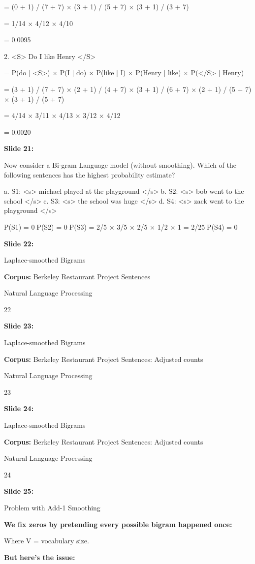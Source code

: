 \documentclass[11pt,a4paper]{article}
\begin{document}
= (0 + 1) / (7 + 7) × (3 + 1) / (5 + 7) × (3 + 1) / (3 + 7)

= 1/14 × 4/12 × 4/10

= 0.0095

2. <S> Do I like Henry </S>

= P(do | <S>) × P(I | do) × P(like | I) × P(Henry | like) × P(</S> | Henry)

= (3 + 1) / (7 + 7) × (2 + 1) / (4 + 7) × (3 + 1) / (6 + 7) × (2 + 1) / (5 + 7) × (3 + 1) / (5 + 7)

= 4/14 × 3/11 × 4/13 × 3/12 × 4/12

= 0.0020

\textbf{Slide 21:}

Now consider a Bi-gram Language model (without smoothing). Which of the following sentences has the highest probability estimate?

a. S1: <s> michael played at the playground </s>b. S2: <s> bob went to the school </s>c. S3: <s> the school was huge </s>d. S4: <s> zack went to the playground </s>

P(S1) = 0P(S2) = 0P(S3) = 2/5 × 3/5 × 2/5 × 1/2 × 1 = 2/25P(S4) = 0

\textbf{Slide 22:}

Laplace-smoothed Bigrams

\textbf{Corpus:}  Berkeley Restaurant Project Sentences

Natural Language Processing

22

\textbf{Slide 23:}

Laplace-smoothed Bigrams

\textbf{Corpus:}  Berkeley Restaurant Project Sentences: Adjusted counts

Natural Language Processing

23

\textbf{Slide 24:}

Laplace-smoothed Bigrams

\textbf{Corpus:}  Berkeley Restaurant Project Sentences: Adjusted counts

Natural Language Processing

24

\textbf{Slide 25:}

Problem with Add-1 Smoothing

\textbf{We fix zeros by pretending every possible bigram happened once:} 

Where V = vocabulary size.

\textbf{But here’s the issue:} 
\end{document}
